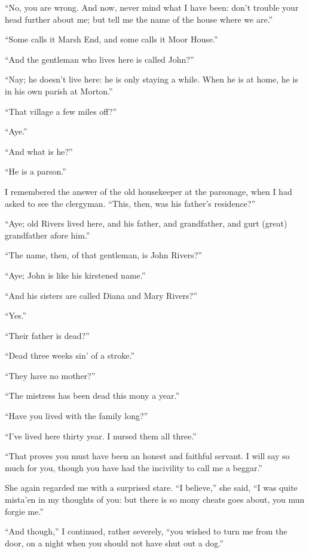 \enquote{No, you are wrong. And now, never mind what I have been: don't
	trouble your head further about me; but tell me the name of the house
	where we are.}

\enquote{Some calls it Marsh End, and some calls it Moor House.}

\enquote{And the gentleman who lives here is called \Mr{} \St{} John?}

\enquote{Nay; he doesn't live here: he is only staying a while. When he
	is at home, he is in his own parish at Morton.}

\enquote{That village a few miles off?} %

\enquote{Aye.}

\enquote{And what is he?}

\enquote{He is a parson.}

I remembered the answer of the old housekeeper at the parsonage, when I
had asked to see the clergyman. \enquote{This, then, was his father's
	residence?}

\enquote{Aye; old \Mr{} Rivers lived here, and his father, and
	grandfather, and gurt (great) grandfather afore him.}

\enquote{The name, then, of that gentleman, is \Mr{} \St{} John Rivers?}

\enquote{Aye; \St{} John is like his kirstened name.}

\enquote{And his sisters are called Diana and Mary Rivers?}

\enquote{Yes.}

\enquote{Their father is dead?}

\enquote{Dead three weeks sin' of a stroke.}

\enquote{They have no mother?}

\enquote{The mistress has been dead this mony a year.}

\enquote{Have you lived with the family long?}

\enquote{I've lived here thirty year. I nursed them all three.}

\enquote{That proves you must have been an honest and faithful servant.
	I will say so much for you, though you have had the incivility to call
	me a beggar.}

She again regarded me with a surprised stare. \enquote{I believe,} she
said, \enquote{I was quite mista'en in my thoughts of you: but there is
	so mony cheats goes about, you mun forgie me.}

\enquote{And though,} I continued, rather severely, \enquote{you wished
	to turn me from the door, on a night when you should not have shut out a
	dog.}

